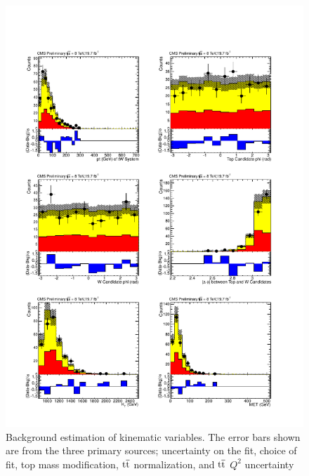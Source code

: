 \begin{figure}[htcb]
\centering
\includegraphics[width=.7\textwidth]{AN-14-049/figs/KinPlots_Data2.pdf}
\caption{Background estimation of kinematic variables.  
The error bars shown are from the three primary sources; uncertainty on the fit, choice of fit, top mass modification, $\mathrm{t\overline{t}}$ normalization, and $\mathrm{t\overline{t}}$ $Q^2$ uncertainty}
\label{figs:bskinplotsdata2}
\end{figure}  
\clearpage

